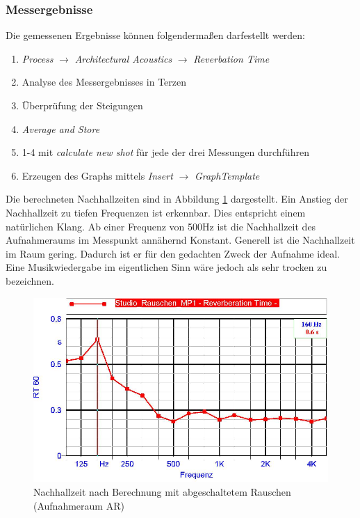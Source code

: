 \documentclass[11pt]{report}
\begin{document}
\subsubsection{Messergebnisse}
\label{anleitung}
Die gemessenen Ergebnisse k\"onnen folgenderma\ss en darfestellt werden:
\begin{enumerate}
\item \textit{Process} $\rightarrow$ \textit{Architectural Acoustics} $\rightarrow$ \textit{Reverbation Time}
\item Analyse des Messergebnisses in Terzen
\item \"Uberpr\"ufung der Steigungen 
\item \textit{Average and Store}
\item 1-4 mit \textit{calculate new shot} f\"ur jede der drei Messungen durchf\"uhren
\item Erzeugen des Graphs mittels \textit{Insert} $\rightarrow$ \textit{GraphTemplate}
\end{enumerate}
Die berechneten Nachhallzeiten sind in Abbildung \ref{fig:rauschenmp1} dargestellt. Ein Anstieg der Nachhallzeit zu tiefen Frequenzen ist erkennbar. Dies entspricht einem nat\"urlichen Klang. Ab einer Frequenz von 500Hz ist die Nachhallzeit des Aufnahmeraums im Messpunkt ann\"ahernd Konstant. Generell ist die Nachhallzeit im Raum gering. Dadurch ist er f\"ur den gedachten Zweck der Aufnahme ideal. Eine Musikwiedergabe im eigentlichen Sinn w\"are jedoch als sehr trocken zu bezeichnen.
\begin{figure}[htbp]
\begin{center}
\includegraphics[width=14cm,keepaspectratio=true]{RauschenMP1}
\caption{Nachhallzeit nach Berechnung mit abgeschaltetem Rauschen (Aufnahmeraum AR)}
\label{fig:rauschenmp1}
\end{center}
\end{figure}
\end{document}
